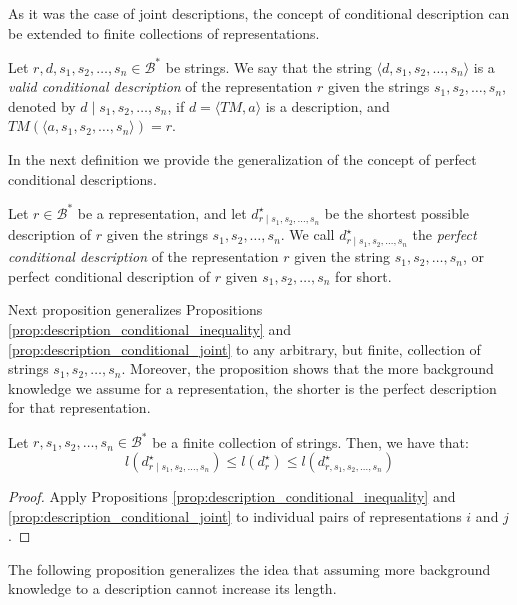 As it was the case of joint descriptions, the concept of conditional description can be extended to finite collections of representations.

\begin{definition}
Let $r, d, s_1, s_2, \ldots, s_n \in \mathcal{B}^\ast$ be strings. We say that the string $\langle d, s_1, s_2, \ldots, s_n \rangle$ is a \emph{valid conditional description} of the representation $r$ given the strings $s_1, s_2, \ldots, s_n$, denoted by $d \mid s_1, s_2, \ldots, s_n$, if $d = \langle TM, a \rangle$ is a description, and $TM \left(\langle a, s_1, s_2, \ldots, s_n \rangle \right) = r$.
\end{definition}

In the next definition we provide the generalization of the concept of perfect conditional descriptions.

\begin{definition}
Let $r \in \mathcal{B}^\ast$ be a representation, and let $d^\star_{r \mid s_1, s_2, \ldots, s_n}$ be the shortest possible description of $r$ given the strings $s_1, s_2, \ldots, s_n$. We call $d^\star_{r \mid s_1, s_2, \ldots, s_n}$ the \emph{perfect conditional description} of the representation $r$ given the string $s_1, s_2, \ldots, s_n$, or perfect conditional description of $r$ given $s_1, s_2, \ldots, s_n$ for short.
\end{definition}

Next proposition generalizes Propositions \ref{prop:description_conditional_inequality} and \ref{prop:description_conditional_joint} to any arbitrary, but finite, collection of strings $s_1, s_2, \ldots, s_n$. Moreover, the proposition shows that the more background knowledge we assume for a representation, the shorter is the perfect description for that representation.

\begin{proposition}
Let $r, s_1, s_2, \ldots, s_n \in \mathcal{B}^\ast$ be a finite collection of strings. Then, we have that:
\[
l \left( d^\star_{r \mid s_1, s_2, \ldots, s_n} \right) \leq l \left( d^\star_r \right) \leq l \left( d^\star_{r,s_1, s_2, \ldots, s_n} \right)
\]
\end{proposition}
\begin{proof}
Apply Propositions \ref{prop:description_conditional_inequality} and \ref{prop:description_conditional_joint} to individual pairs of representations $i$ and $j$.
\end{proof}

The following proposition generalizes the idea that assuming more background knowledge to a description cannot increase its length.

